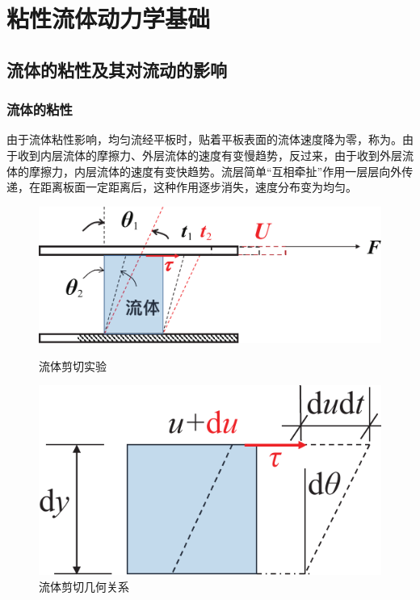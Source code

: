 \chapter{粘性流体动力学基础}
\thispagestyle{empty}
\section{流体的粘性及其对流动的影响}
\subsection{流体的粘性}
由于流体粘性影响，均匀流经平板时，贴着平板表面的流体速度降为零，称为。由于收到内层流体的摩擦力、外层流体的速度有变慢趋势，反过来，由于收到外层流体的摩擦力，内层流体的速度有变快趋势。流层简单“互相牵扯”作用一层层向外传递，在距离板面一定距离后，这种作用逐步消失，速度分布变为均匀。


\begin{figure}[!htb]
	\centering
	\begin{minipage}{0.45 \linewidth}
		\centering
		\includegraphics[width=\linewidth]{pic/流体粘性实验.pdf}
		\caption{流体剪切实验}
		\label{流体剪切实验2}
	\end{minipage}
	\begin{minipage}{0.45 \linewidth}
		\centering
		\includegraphics[width=0.7\linewidth]{pic/粘性几何关系.pdf}
		\vspace*{0.1em}
		\caption{流体剪切几何关系}
		\label{流体剪切几何关系2}
	\end{minipage}
\end{figure}
\vspace*{-1em}

